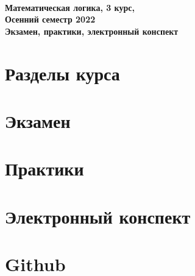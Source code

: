 \documentclass[a4paper,12pt]{article}
\begin{document}
\begin{center} {\LARGE\bf \ \\
	Математическая логика, 3 курс, \\
	Осенний семестр 2022 \\
	Экзамен, практики, электронный конспект \\}
\end{center}

\section{Разделы курса}

\section{Экзамен}

\section{Практики}

\section{Электронный конспект}

\section{Github}
\end{document}
